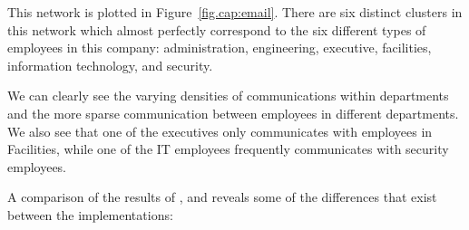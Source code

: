 This network is plotted in Figure~\ref{fig.cap:email}. There are six distinct clusters in this network which almost perfectly correspond to the six different types of employees in this company: administration, engineering, executive, facilities, information technology, and security.

We can clearly see the varying densities of communications within departments and the more sparse communication between employees in different departments. We also see that one of the executives only communicates with employees in Facilities, while one of the IT employees frequently communicates with security employees.

A comparison of the results of ,  and  reveals some of the %
differences that exist between the implementations:

